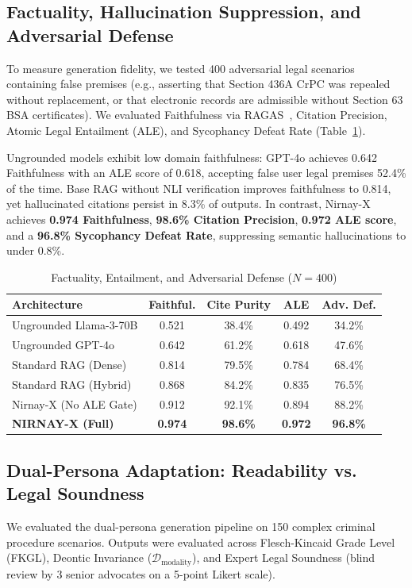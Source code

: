 \documentclass[conference]{IEEEtran}
\begin{document}
\subsection{Factuality, Hallucination Suppression, and Adversarial Defense}
To measure generation fidelity, we tested 400 adversarial legal scenarios containing false premises (e.g., asserting that Section 436A CrPC was repealed without replacement, or that electronic records are admissible without Section 63 BSA certificates). We evaluated Faithfulness via RAGAS~\cite{es2024ragas}, Citation Precision, Atomic Legal Entailment (ALE), and Sycophancy Defeat Rate (Table~\ref{tab:factuality}).

Ungrounded models exhibit low domain faithfulness: GPT-4o achieves 0.642 Faithfulness with an ALE score of 0.618, accepting false user legal premises 52.4\% of the time. Base RAG without NLI verification improves faithfulness to 0.814, yet hallucinated citations persist in 8.3\% of outputs. In contrast, Nirnay-X achieves \textbf{0.974 Faithfulness}, \textbf{98.6\% Citation Precision}, \textbf{0.972 ALE score}, and a \textbf{96.8\% Sycophancy Defeat Rate}, suppressing semantic hallucinations to under 0.8\%.

\begin{table}[!t]
\caption{Factuality, Entailment, and Adversarial Defense ($N=400$)}
\label{tab:factuality}
\centering
\small
\begin{tabularx}{\columnwidth}{lcccc}
\toprule
\textbf{Architecture} & \textbf{Faithful.} & \textbf{Cite Purity} & \textbf{ALE} & \textbf{Adv. Def.} \\
\midrule
Ungrounded Llama-3-70B & 0.521 & 38.4\% & 0.492 & 34.2\% \\
Ungrounded GPT-4o & 0.642 & 61.2\% & 0.618 & 47.6\% \\
Standard RAG (Dense) & 0.814 & 79.5\% & 0.784 & 68.4\% \\
Standard RAG (Hybrid) & 0.868 & 84.2\% & 0.835 & 76.5\% \\
Nirnay-X (No ALE Gate) & 0.912 & 92.1\% & 0.894 & 88.2\% \\
\midrule
\textbf{NIRNAY-X (Full)} & \textbf{0.974} & \textbf{98.6\%} & \textbf{0.972} & \textbf{96.8\%} \\
\bottomrule
\end{tabularx}
\end{table}

\subsection{Dual-Persona Adaptation: Readability vs. Legal Soundness}
We evaluated the dual-persona generation pipeline on 150 complex criminal procedure scenarios. Outputs were evaluated across Flesch-Kincaid Grade Level (FKGL), Deontic Invariance ($\mathcal{D}_{\text{modality}}$), and Expert Legal Soundness (blind review by 3 senior advocates on a 5-point Likert scale).
\end{document}

